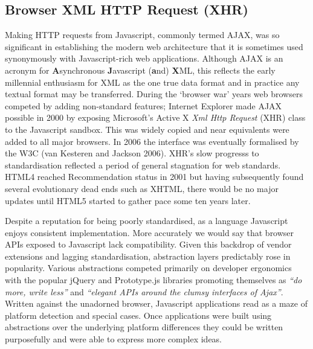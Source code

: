\documentclass[12pt, ]{article}
\begin{document}
\subsection{Browser XML HTTP Request
(XHR)}\label{browser-xml-http-request-xhr}

Making HTTP requests from Javascript, commonly termed AJAX, was so
significant in establishing the modern web architecture that it is
sometimes used synonymously with Javascript-rich web applications.
Although AJAX is an acronym for \textbf{A}synchronous
\textbf{J}avascript (\textbf{a}nd) \textbf{X}ML, this reflects the early
millennial enthusiasm for XML as the one true data format and in
practice any textual format may be transferred. During the `browser war'
years web browsers competed by adding non-standard features; Internet
Explorer made AJAX possible in 2000 by exposing Microsoft's Active X
\emph{Xml Http Request} (XHR) class to the Javascript sandbox. This was
widely copied and near equivalents were added to all major browsers. In
2006 the interface was eventually formalised by the W3C (van Kesteren
and Jackson 2006). XHR's slow progresss to standardisation reflected a
period of general stagnation for web standards. HTML4 reached
Recommendation status in 2001 but having subsequently found several
evolutionary dead ends such as XHTML, there would be no major updates
until HTML5 started to gather pace some ten years later.

Despite a reputation for being poorly standardised, as a language
Javascript enjoys consistent implementation. More accurately we would
say that browser APIs exposed to Javascript lack compatibility. Given
this backdrop of vendor extensions and lagging standardisation,
abstraction layers predictably rose in popularity. Various abstractions
competed primarily on developer ergonomics with the popular jQuery and
Prototype.js libraries promoting themselves as \emph{``do more, write
less''} and \emph{``elegant APIs around the clumsy interfaces of
Ajax''}. Written against the unadorned browser, Javascript applications
read as a maze of platform detection and special cases. Once
applications were built using abstractions over the underlying platform
differences they could be written purposefully and were able to express
more complex ideas.
\end{document}

